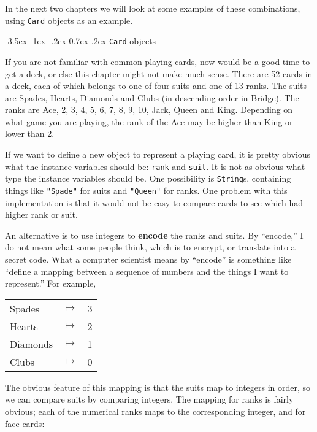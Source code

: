 \documentclass{book}
\makeatletter
\renewcommand{\section}{\@startsection 
    {section} {1} {0mm}%
    {-3.5ex \@plus -1ex \@minus -.2ex}%
    {0.7ex \@plus.2ex}%
    {\normalfont\Large\bfseries}}
\makeatother
\begin{document}
In the next two chapters we will look at some examples of these
combinations, using {\tt Card} objects as an example.


\section{{\tt Card} objects}
\label{card}

If you are not familiar with common playing cards, now would be a good
time to get a deck, or else this chapter might not make much sense.
There are 52 cards in a deck, each of which belongs to one of four
suits and one of 13 ranks.  The suits are Spades, Hearts, Diamonds and
Clubs (in descending order in Bridge).  The ranks are Ace, 2, 3, 4, 5,
6, 7, 8, 9, 10, Jack, Queen and King.  Depending on what game you are
playing, the rank of the Ace may be higher than King or lower than 2.


If we want to define a new object to represent a playing card, it is
pretty obvious what the instance variables should be: {\tt rank} and
{\tt suit}.  It is not as obvious what type the instance variables
should be.  One possibility is {\tt String}s, containing things like
{\tt "Spade"} for suits and {\tt "Queen"} for ranks.  One problem with
this implementation is that it would not be easy to compare cards to
see which had higher rank or suit.


An alternative is to use integers to {\bf encode} the ranks and
suits.  By ``encode,'' I do not mean what some people think, which
is to encrypt, or translate into a secret code.  What a computer
scientist means by ``encode'' is something like ``define a mapping
between a sequence of numbers and the things I want to represent.''
For example,

\begin{tabular}{l c l}
Spades & $\mapsto$ & 3 \\
Hearts & $\mapsto$ & 2 \\
Diamonds & $\mapsto$ & 1 \\
Clubs & $\mapsto$ & 0
\end{tabular}

The obvious feature of this mapping is that the suits map to
integers in order, so we can compare suits by comparing integers.
The mapping for ranks is fairly obvious; each of the numerical
ranks maps to the corresponding integer, and for face cards:
\end{document}
